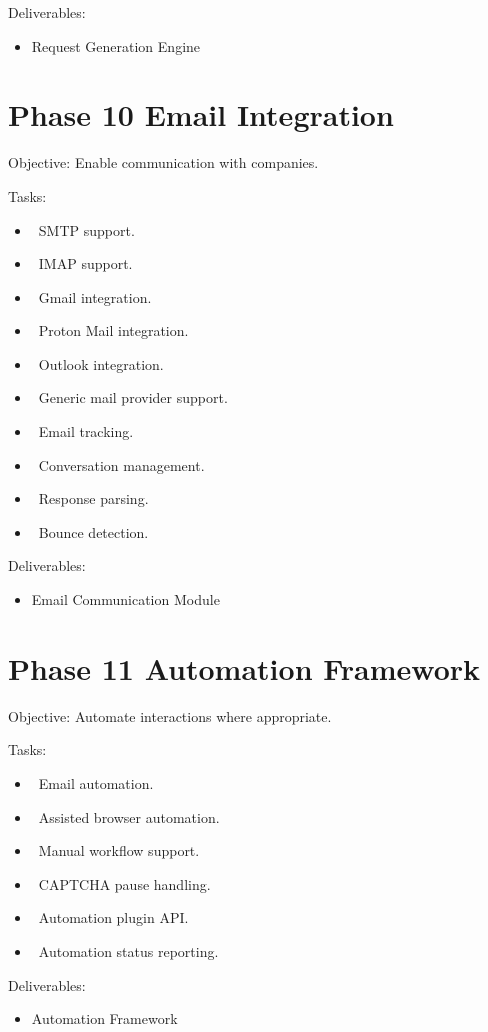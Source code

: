 Deliverables:
\begin{itemize}
	\item Request Generation Engine
\end{itemize}
\section{Phase 10 Email Integration}
Objective: Enable communication with companies.

Tasks:
\begin{itemize}
	\item[] \checkbox\ SMTP support.
	\item[] \checkbox\ IMAP support.
	\item[] \checkbox\ Gmail integration.
	\item[] \checkbox\ Proton Mail integration.
	\item[] \checkbox\ Outlook integration.
	\item[] \checkbox\ Generic mail provider support.
	\item[] \checkbox\ Email tracking.
	\item[] \checkbox\ Conversation management.
	\item[] \checkbox\ Response parsing.
	\item[] \checkbox\ Bounce detection.
\end{itemize}

Deliverables:
\begin{itemize}
	\item Email Communication Module
\end{itemize}
\section{Phase 11 Automation Framework}
Objective: Automate interactions where appropriate.

Tasks:
\begin{itemize}
	\item[] \checkbox\ Email automation.
	\item[] \checkbox\ Assisted browser automation.
	\item[] \checkbox\ Manual workflow support.
	\item[] \checkbox\ CAPTCHA pause handling.
	\item[] \checkbox\ Automation plugin API.
	\item[] \checkbox\ Automation status reporting.
\end{itemize}

Deliverables:
\begin{itemize}
	\item Automation Framework
\end{itemize}
